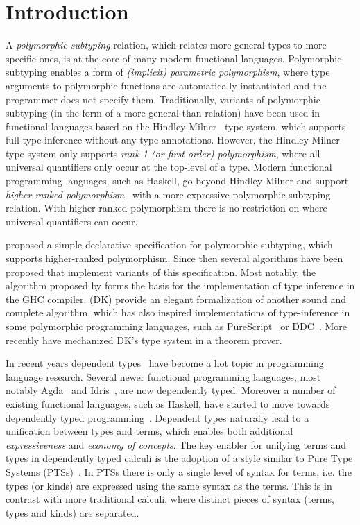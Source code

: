 \section{Introduction}

A \emph{polymorphic subtyping} relation, which relates more general
types to more specific ones, is at the core of many modern functional
languages. Polymorphic subtyping enables a form of
\emph{(implicit) parametric polymorphism}, where type arguments to polymorphic
functions are automatically instantiated and the programmer does not specify them.
Traditionally, variants of polymorphic subtyping (in the form of a more-general-than relation)
have been used in functional languages based on the
Hindley-Milner~\citep{hindley1969principal,milner1978theory,damas1982principal}
type system, which supports full type-inference without any type annotations.
However, the Hindley-Milner type system only supports \emph{rank-1 (or first-order)
polymorphism}, where all universal quantifiers only occur at the top-level
of a type. Modern functional programming languages, such as Haskell, go beyond
Hindley-Milner and support \emph{higher-ranked polymorphism}~\citep{odersky1996putting,jones2007practical}
with a more expressive
polymorphic subtyping relation. With higher-ranked
polymorphism there is no restriction on where universal quantifiers can occur.

\citet{odersky1996putting} proposed a
simple declarative specification for polymorphic subtyping, which supports higher-ranked polymorphism.
Since then several
algorithms have been proposed that implement variants of this specification. Most
notably, the algorithm proposed by \citet{jones2007practical} forms the basis
for the implementation of type inference in the GHC compiler.
\citet{dunfield2013complete} (DK) provide an elegant
formalization of another sound and complete algorithm, which has
also inspired implementations of type-inference in some polymorphic
programming languages, such as PureScript~\citep{PureScript} or DDC~\citep{Disciple}.
More recently \citet{zhao19mechanical} have mechanized DK's type system in a theorem prover.


In recent years dependent
types~\citep{coc,cayenne,dep:pisigma,sjoberg:msfp12,guru,fc:kind,zombie:popl14,zombie:popl15}
have become a hot topic in programming
language research. Several newer
functional programming languages, most notably Agda~\citep{2007_norell_agda} and
Idris~\citep{brady2013idris}, are now dependently typed. Moreover a number of existing functional
languages, such as Haskell, have started to move towards dependently typed programming~\citep{dependenthaskell}. Dependent types naturally lead to a unification between types and terms, which enables both
additional \emph{expressiveness} and \emph{economy of concepts}.
The key enabler for unifying terms and types in dependently typed
calculi is the adoption of a style similar to
Pure Type Systems (PTSs)~\citep{pts}. In PTSs there is only a single level
of syntax for terms, i.e. the types (or kinds) are expressed using the
same syntax as the terms. This is in contrast with more traditional calculi, where
distinct pieces of syntax (terms, types and kinds) are separated.

